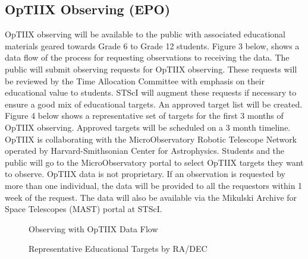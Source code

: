 \subsection {OpTIIX Observing (EPO)}
OpTIIX observing will be available to the public with associated educational materials geared towards Grade 6 to Grade 12 students. Figure 3 below, shows a data flow of the process for requesting observations to receiving the data.  The public will submit observing requests for OpTIIX observing.   These requests will be reviewed by the Time Allocation Committee with emphasis on their educational value to students. STScI will augment these requests if necessary to ensure a good mix of educational targets.  An approved target list will be created.  Figure 4 below shows a representative set of targets for the first 3 months of OpTIIX observing.  Approved targets will be scheduled on a 3 month timeline.  OpTIIX is collaborating with the MicroObservatory Robotic Telescope Network operated by Harvard-Smithsonian Center for Astrophysics.  Students and the public will go to the MicroObservatory portal to select OpTIIX targets they want to observe.  OpTIIX data is not proprietary.   If an observation is requested by more than one individual, the data will be provided to all the requestors within 1 week of the request.  The data will also be available via the Mikulski Archive for Space Telescopes (MAST) portal at STScI.

\begin{figure}[ht!]
\caption{Observing with OpTIIX Data Flow}
\end{figure}

\begin{figure}[ht!]
\caption{Representative Educational Targets by RA/DEC}
\end{figure}


